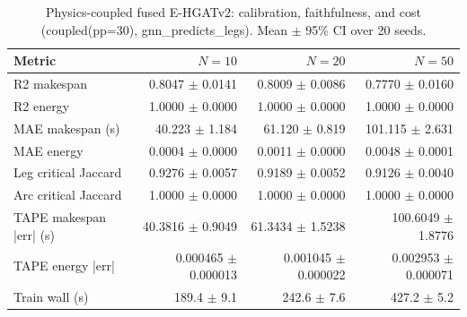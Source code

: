 \begin{table}[t]
\centering
\caption{Physics-coupled fused E-HGATv2: calibration, faithfulness, and cost (coupled(pp=30), gnn_predicts_legs). Mean $\pm$ 95\% CI over 20 seeds.}
\label{tab:fused-coupled}
\begin{tabular}{lrrr}
\toprule
Metric & $N=10$ & $N=20$ & $N=50$ \\
\midrule
R2 makespan & 0.8047 $\pm$ 0.0141 & 0.8009 $\pm$ 0.0086 & 0.7770 $\pm$ 0.0160 \\
R2 energy & 1.0000 $\pm$ 0.0000 & 1.0000 $\pm$ 0.0000 & 1.0000 $\pm$ 0.0000 \\
MAE makespan (s) & 40.223 $\pm$ 1.184 & 61.120 $\pm$ 0.819 & 101.115 $\pm$ 2.631 \\
MAE energy & 0.0004 $\pm$ 0.0000 & 0.0011 $\pm$ 0.0000 & 0.0048 $\pm$ 0.0001 \\
Leg critical Jaccard & 0.9276 $\pm$ 0.0057 & 0.9189 $\pm$ 0.0052 & 0.9126 $\pm$ 0.0040 \\
Arc critical Jaccard & 1.0000 $\pm$ 0.0000 & 1.0000 $\pm$ 0.0000 & 1.0000 $\pm$ 0.0000 \\
TAPE makespan |err| (s) & 40.3816 $\pm$ 0.9049 & 61.3434 $\pm$ 1.5238 & 100.6049 $\pm$ 1.8776 \\
TAPE energy |err| & 0.000465 $\pm$ 0.000013 & 0.001045 $\pm$ 0.000022 & 0.002953 $\pm$ 0.000071 \\
Train wall (s) & 189.4 $\pm$ 9.1 & 242.6 $\pm$ 7.6 & 427.2 $\pm$ 5.2 \\
\bottomrule
\end{tabular}
\end{table}
